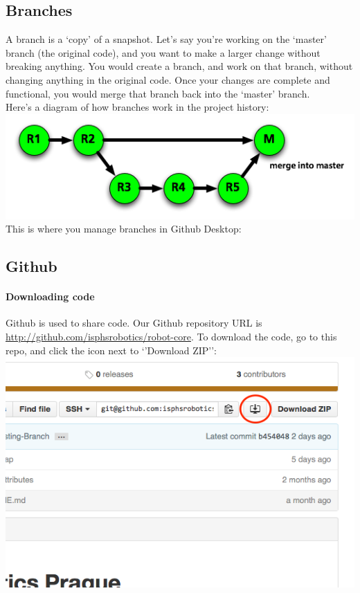 \documentclass[12p,a4papert]{article}
\begin{document}
\subsection{Branches}
A branch is a `copy' of a snapshot. Let's say you're working on the `master' branch (the original code), and you want to make a larger change without breaking anything. You would create a branch, and work on that branch, without changing anything in the original code. Once your changes are complete and functional, you would merge that branch back into the `master' branch.\\
Here's a diagram of how branches work in the project history:\\
\includegraphics[scale=0.6]{git-branches}\\
This is where you manage branches in Github Desktop:

\subsection{Github}
\paragraph{Downloading code}Github is used to share code. Our Github repository URL is \url{http://github.com/isphsrobotics/robot-core}. To download the code, go to this repo, and click the icon next to `'Download ZIP'':\\
\includegraphics[scale=0.6]{download-repo}
\end{document}
